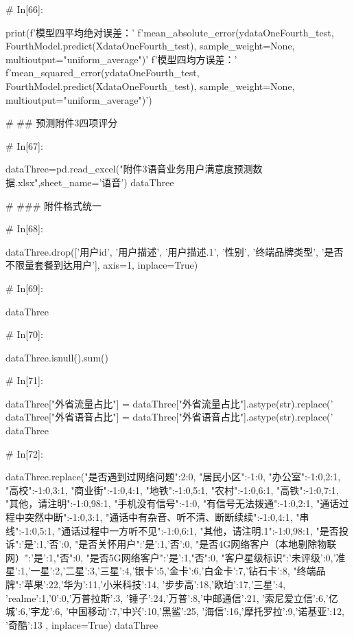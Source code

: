 \documentclass{MathorCupmodeling}
\begin{document}
\begin{python}
# In[66]:


print(f'模型四平均绝对误差：'
      f'{mean_absolute_error(ydataOneFourth_test, FourthModel.predict(XdataOneFourth_test), sample_weight=None, multioutput="uniform_average")}\n'
      f'模型四均方误差：'
      f'{mean_squared_error(ydataOneFourth_test, FourthModel.predict(XdataOneFourth_test), sample_weight=None, multioutput="uniform_average")}')


# ## 预测附件3四项评分

# In[67]:


dataThree=pd.read_excel("附件3语音业务用户满意度预测数据.xlsx",sheet_name='语音')
dataThree


# ### 附件格式统一

# In[68]:


dataThree.drop(['用户id',
                '用户描述',
                '用户描述.1',
                '性别',
                '终端品牌类型',
                '是否不限量套餐到达用户'], axis=1, inplace=True)


# In[69]:


dataThree


# In[70]:


dataThree.isnull().sum()


# In[71]:


dataThree["外省流量占比"] = dataThree["外省流量占比"].astype(str).replace('%
dataThree["外省语音占比"] = dataThree["外省语音占比"].astype(str).replace('%
dataThree


# In[72]:


dataThree.replace({"是否遇到过网络问题":{2:0},
                   "居民小区":{-1:0},
                   "办公室":{-1:0,2:1},
                   "高校":{-1:0,3:1},
                   "商业街":{-1:0,4:1},
                   "地铁":{-1:0,5:1},
                   "农村":{-1:0,6:1},
                   "高铁":{-1:0,7:1},
                   "其他，请注明":{-1:0,98:1},
                   "手机没有信号":{-1:0},
                   "有信号无法拨通":{-1:0,2:1},
                   "通话过程中突然中断":{-1:0,3:1},
                   "通话中有杂音、听不清、断断续续":{-1:0,4:1},
                   "串线":{-1:0,5:1},
                   "通话过程中一方听不见":{-1:0,6:1},
                   "其他，请注明.1":{-1:0,98:1},
                   "是否投诉":{'是':1,'否':0},
                   "是否关怀用户":{'是':1,'否':0},
                   "是否4G网络客户（本地剔除物联网）":{'是':1,"否":0},
                   "是否5G网络客户":{'是':1,"否":0},
                   "客户星级标识":{'未评级':0,'准星':1,'一星':2,'二星':3,'三星':4,'银卡':5,'金卡':6,'白金卡':7,'钻石卡':8},
                   "终端品牌":{'苹果':22,'华为':11,'小米科技':14,
                            '步步高':18,'欧珀':17,'三星':4,
                            'realme':1,'0':0,'万普拉斯':3,
                            '锤子':24,'万普':8,'中邮通信':21,
                            '索尼爱立信':6,'亿城':6,'宇龙':6,
                            '中国移动':7,'中兴':10,'黑鲨':25,
                            '海信':16,'摩托罗拉':9,'诺基亚':12,
                            '奇酷':13}
                   }, inplace=True)
dataThree



\end{python}
\end{document}

